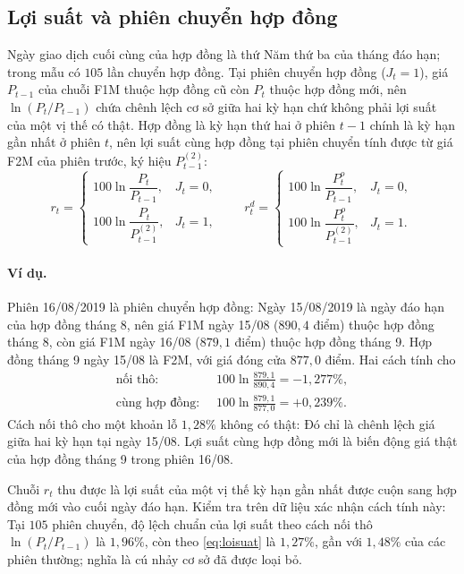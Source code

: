 \documentclass[12pt,a4paper]{article}
\theoremstyle{definition}
\theoremstyle{remark}
\begin{document}
\subsection{Lợi suất và phiên chuyển hợp đồng}\label{sec:chuyenhd}

Ngày giao dịch cuối cùng của hợp đồng là thứ Năm thứ ba của tháng đáo hạn; trong mẫu có $105$ lần chuyển hợp đồng. Tại phiên chuyển hợp đồng ($J_t=1$), giá $P_{t-1}$ của chuỗi F1M thuộc hợp đồng cũ còn $P_t$ thuộc hợp đồng mới, nên $\ln(P_t/P_{t-1})$ chứa chênh lệch cơ sở giữa hai kỳ hạn chứ không phải lợi suất của một vị thế có thật. Hợp đồng là kỳ hạn thứ hai ở phiên $t-1$ chính là kỳ hạn gần nhất ở phiên $t$, nên lợi suất cùng hợp đồng tại phiên chuyển tính được từ giá F2M của phiên trước, ký hiệu $P^{(2)}_{t-1}$:
\begin{equation}\label{eq:loisuat}
r_t=\begin{cases}100\ln\dfrac{P_t}{P_{t-1}}, & J_t=0,\\[8pt] 100\ln\dfrac{P_t}{P^{(2)}_{t-1}}, & J_t=1,\end{cases}
\qquad
r^{d}_t=\begin{cases}100\ln\dfrac{P^{o}_t}{P_{t-1}}, & J_t=0,\\[8pt] 100\ln\dfrac{P^{o}_t}{P^{(2)}_{t-1}}, & J_t=1.\end{cases}
\end{equation}
\paragraph{Ví dụ.} Phiên 16/08/2019 là phiên chuyển hợp đồng: Ngày 15/08/2019 là ngày đáo hạn của hợp đồng tháng 8, nên giá F1M ngày 15/08 ($890{,}4$ điểm) thuộc hợp đồng tháng 8, còn giá F1M ngày 16/08 ($879{,}1$ điểm) thuộc hợp đồng tháng 9. Hợp đồng tháng 9 ngày 15/08 là F2M, với giá đóng cửa $877{,}0$ điểm. Hai cách tính cho
\begin{align*}
\text{nối thô: }&\ 100\ln\frac{879{,}1}{890{,}4}=-1{,}277\%,\\
\text{cùng hợp đồng: }&\ 100\ln\frac{879{,}1}{877{,}0}=+0{,}239\%.
\end{align*}
Cách nối thô cho một khoản lỗ $1{,}28\%$ không có thật: Đó chỉ là chênh lệch giá giữa hai kỳ hạn tại ngày 15/08. Lợi suất cùng hợp đồng mới là biến động giá thật của hợp đồng tháng 9 trong phiên 16/08.

Chuỗi $r_t$ thu được là lợi suất của một vị thế kỳ hạn gần nhất được cuộn sang hợp đồng mới vào cuối ngày đáo hạn. Kiểm tra trên dữ liệu xác nhận cách tính này: Tại $105$ phiên chuyển, độ lệch chuẩn của lợi suất theo cách nối thô $\ln(P_t/P_{t-1})$ là $1{,}96\%$, còn theo \eqref{eq:loisuat} là $1{,}27\%$, gần với $1{,}48\%$ của các phiên thường; nghĩa là cú nhảy cơ sở đã được loại bỏ.
\end{document}
